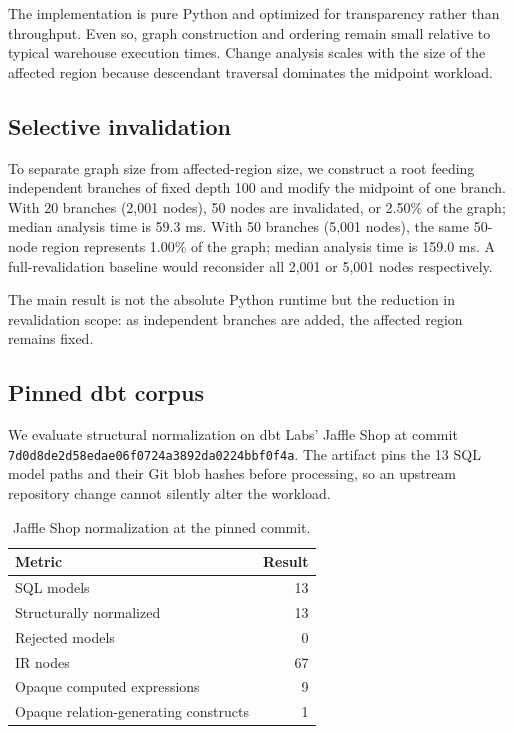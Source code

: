 The implementation is pure Python and optimized for transparency rather than throughput. Even so, graph construction and ordering remain small relative to typical warehouse execution times. Change analysis scales with the size of the affected region because descendant traversal dominates the midpoint workload.

\subsection{Selective invalidation}

To separate graph size from affected-region size, we construct a root feeding independent branches of fixed depth 100 and modify the midpoint of one branch. With 20 branches (2,001 nodes), 50 nodes are invalidated, or 2.50\% of the graph; median analysis time is 59.3 ms. With 50 branches (5,001 nodes), the same 50-node region represents 1.00\% of the graph; median analysis time is 159.0 ms. A full-revalidation baseline would reconsider all 2,001 or 5,001 nodes respectively.

The main result is not the absolute Python runtime but the reduction in revalidation scope: as independent branches are added, the affected region remains fixed.

\subsection{Pinned dbt corpus}

We evaluate structural normalization on dbt Labs' Jaffle Shop at commit \texttt{7d0d8de2d58edae06f0724a3892da0224bbf0f4a}. The artifact pins the 13 SQL model paths and their Git blob hashes before processing, so an upstream repository change cannot silently alter the workload.

\begin{table}[t]
\caption{Jaffle Shop normalization at the pinned commit.}
\label{tab:jaffle}
\small
\begin{tabular}{lr}
\toprule
Metric & Result \\
\midrule
SQL models & 13 \\
Structurally normalized & 13 \\
Rejected models & 0 \\
IR nodes & 67 \\
Opaque computed expressions & 9 \\
Opaque relation-generating constructs & 1 \\
\bottomrule
\end{tabular}
\end{table}

